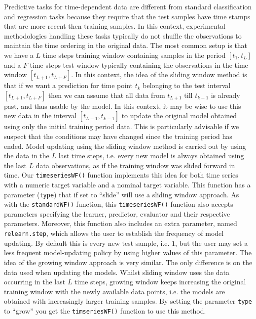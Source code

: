 \documentclass[10pt,a4paper]{article}\usepackage[]{graphicx}\usepackage[]{color}
\begin{document}
Predictive tasks for time-dependent data are different from standard
classification and regression tasks because they require that the test
samples have time stamps that are more recent then training
samples. In this context, experimental methodologies handling these
tasks typically do not shuffle the observations to maintain the time ordering
in the original data. The most common setup is that we have a $L$ time steps
training window containing samples in the period $[t_1,t_L]$ and a $F$
time steps test window typically containing the observations in the
time window $[t_{L+1},t_{L+F}]$. In this context, the idea of the
sliding window method is that if we want a prediction for time point
$t_k$ belonging to the test interval $[t_{L+1},t_{L+F}]$ then we can
assume that all data from $t_{L+1}$ till $t_{k-1}$ is already past,
and thus usable by the model. In this context, it may be wise to use
this new data in the interval $[t_{L+1},t_{k-1}]$ to update the
original model obtained using only the initial training period data. This is
particularly advisable if we suspect that the conditions may have
changed since the training period has ended. Model updating using the
sliding window method is carried out by using the data in the $L$ last
time steps, i.e. every new model is always obtained using the last $L$
data observations, as if the training window was slided forward in
time. Our \texttt{timeseriesWF()} function implements this idea for
both time series with a numeric target variable and a nominal target
variable. This function has a parameter (\texttt{type}) that if set to
``slide'' will use a sliding window approach. As with the
\texttt{standardWF()} function, this \texttt{timeseriesWF()} function
also accepts parameters specifying the learner, predictor, evaluator
and their respective parameters. Moreover, this function also includes
an extra parameter, named \texttt{relearn.step}, which allows the user
to establish the frequency of model updating. By default this is every
new test sample, i.e. $1$, but the user may set a less frequent
model-updating policy by using higher values of this parameter.  The
idea of the growing window approach is very similar. The only difference
is on the data used when updating the models. Whilst sliding window
uses the data occurring in the last $L$ time steps, growing window
keeps increasing the original training window with the newly available
data points, i.e. the models are obtained with increasingly larger
training samples. By setting the parameter \texttt{type} to ``grow''
you get the \texttt{timseriesWF()} function to use this method.
\end{document}
